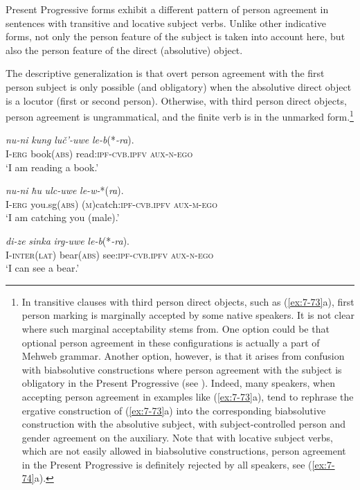 ﻿\documentclass[output=paper]{langsci/langscibook}
\begin{document}
Present Progressive forms exhibit a different pattern of person
agreement in sentences with transitive and locative subject verbs.
Unlike other indicative forms, not only the person feature of the
subject is taken into account here, but also the person feature of the
direct (absolutive) object.

The descriptive generalization is that overt person agreement with the
first person subject is only possible (and obligatory) when the
absolutive direct object is a locutor (first or second person).
Otherwise, with third person direct objects, person agreement is
ungrammatical, and the finite verb is in the unmarked form.\footnote{In
  transitive clauses with third person direct objects, such as (\ref{ex:7-73}a),
  first person marking is marginally accepted by some native speakers.
  It is not clear where such marginal acceptability stems from. One
  option could be that optional person agreement in these configurations
  is actually a part of Mehweb grammar. Another option, however, is that
  it arises from confusion with biabsolutive constructions where person
  agreement with the subject is obligatory in the Present Progressive
  (see ). Indeed, many speakers, when accepting person
  agreement in examples like (\ref{ex:7-73}a), tend to rephrase the ergative
  construction of (\ref{ex:7-73}a) into the corresponding biabsolutive
  construction with the absolutive subject, with subject-controlled
  person and gender agreement on the auxiliary. Note that with locative
  subject verbs, which are not easily allowed in biabsolutive
  constructions, person agreement in the Present Progressive is
  definitely rejected by all speakers, see (\ref{ex:7-74}a).}

\ea\label{ex:7-73}
\ea %
\gll \emph{nu-ni} \emph{kung} \emph{luč'-uwe} \emph{le-b}(*\emph{-ra}).\\
I-\textsc{erg} book(\textsc{abs}) read:\textsc{ipf}-\textsc{cvb.ipfv} \textsc{aux}-\textsc{n}-\textsc{ego}\\
\glt `I am reading a book.'

\ex %
\gll \emph{nu-ni} \emph{ħu} \emph{ulc-uwe} \emph{le-w-}*(\emph{ra}).\\
I-\textsc{erg} you.sg(\textsc{abs)} (\textsc{m})catch:\textsc{ipf}-\textsc{cvb.ipfv} \textsc{aux}-\textsc{m}-\textsc{ego}\\
\glt `I am catching you (male).'
\z

\ex\label{ex:7-74}
\ea %
\gll \emph{di-ze} \emph{sinka} \emph{irg-uwe} \emph{le-b}(*\emph{-ra}).\\
I-\textsc{inter(lat)} bear(\textsc{abs}) see:\textsc{ipf}-\textsc{cvb.ipfv} \textsc{aux}-\textsc{n}-\textsc{ego}\\
\glt `I can see a bear.'
\end{document}
